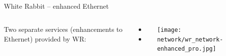 \documentclass[compress,red]{beamer}
\begin{document}
\subsection{}
\begin{frame}{White Rabbit -- enhanced Ethernet}


\begin{columns}[c]
 
  Two separate services (enhancements to Ethernet) provided by WR: 
  \begin{itemize}
    \item \color{blue!90}{Synchronization: \\
accuracy better than 1 ns \\
precision  (tens of ps sdev skew max)}
    \item \color{red}{Deterministic, reliable and low-latency Control Data delivery}
  \end{itemize}

    \begin{center}
    \texttt{[image: network/wr\_network-enhanced\_pro.jpg]}
    \end{center}
\end{columns}

\end{frame}
\end{document}

